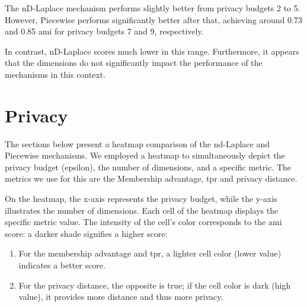 {\begin{figure}[H]
\begin{subfigure}[b]{0.85\textwidth}
\begin{subfigure}[c]{1\textwidth}
        \label{fig:ami_skewed-dataset_comparison_piecewise_2d}
      \end{subfigure}
    \end{subfigure}
  \end{figure}
  The nD-Laplace mechanism performs slightly better from privacy budgets 2 to 5. However, Piecewise performs significantly better after that, achieving around 0.73 and 0.85 \gls{ami} for privacy budgets 7 and 9, respectively.

  In contrast, nD-Laplace scores much lower in this range. Furthermore, it appears that the dimensions do not significantly impact the performance of the mechanisms in this context.
  \newpage
}

\section{Privacy}
The sections below present a heatmap comparison of the nd-Laplace and Piecewise mechanisms.
We employed a heatmap to simultaneously depict the privacy budget (epsilon), the number of dimensions, and a specific metric. The metrics we use for this are the Membership advantage, \gls{tpr} and privacy distance.

On the heatmap, the x-axis represents the privacy budget, while the y-axis illustrates the number of dimensions. Each cell of the heatmap displays the specific metric value. The intensity of the cell's color corresponds to the \gls{ami} score: a darker shade signifies a higher score:
\begin{enumerate}
  \item  For the membership advantage and \gls{tpr}, a lighter cell color (lower value) indicates a better score.
  \item For the privacy distance, the opposite is true; if the cell color is dark (high value), it provides more distance and thus more privacy.
\end{enumerate}
\newpage

